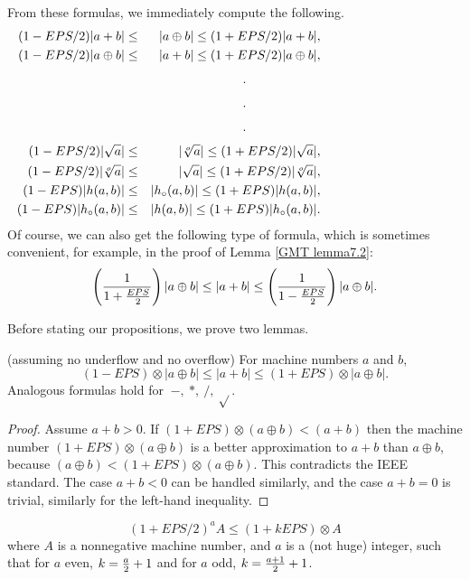  
From these formulas, we immediately compute the following.
\begin{eqnarray*}
(1 - EPS/2) |a + b| &\leq& |a \oplus b| 
\leq (1 + EPS/2) |a+b|, \\ 
  (1 - EPS/2) |a \oplus b|& \leq& |a + b| 
\leq (1 + EPS/2) |a \oplus b|,\\
\noalign{\vskip4pt}
\noalign{\hfil .\hfil }  \noalign{\vskip4pt}
\noalign{\hfil .\hfil } \noalign{\vskip4pt}
\noalign{\hfil .\hfil } \noalign{\vskip4pt}
(1 - EPS/2) |\sqrt a| &\leq&  |\root o \of a| 
\leq (1 + EPS/2) |\sqrt a|, \\ (1 - EPS/2) |\root o \of a|&\leq&  |\sqrt a| 
\leq (1 + EPS/2) |\root o \of a|, \\  (1 - EPS) |h(a,b)| &\leq&  |h_\circ (a,b)| 
\leq (1 + EPS) |h(a,b)|, \\  (1 - EPS) |h_\circ (a,b)| &\leq& |h(a,b)| 
\leq (1 + EPS) |h_\circ (a,b)|.
\end{eqnarray*}
Of course, we can also get the following type of formula, which is sometimes convenient,
 for example, in the proof of Lemma \ref{GMT lemma7.2}:
$$\left({1 \over {1 + {EPS \over 2}}}\right) |a \oplus b| \leq |a + b| 
\leq \left({1 \over {1 - {EPS \over 2}}}\right) |a \oplus b|.$$

Before stating our propositions, we prove two lemmas.

\begin{lemma}\label{GMT 7.0} {\textrm (assuming no underflow and no overflow)}
For machine numbers $a$ and $b${\textrm ,}
$$(1 - EPS) \otimes |a \oplus b| \le |a + b| \le (1 + EPS) \otimes |a \oplus b|.$$
 Analogous formulas hold for $\ -,\ *,\ /,\ \sqrt{}$.
\end{lemma}

\begin{proof}{}
Assume $a+b > 0$.  
If $(1+EPS) \otimes (a \oplus b) < (a+b)$ then the machine number 
$(1+EPS) \otimes (a \oplus b)$ is a better approximation to $a+b$ than $a \oplus b$, because $(a \oplus b) 
< (1+EPS) \otimes (a \oplus b)$.  This contradicts the IEEE standard.  The case $a+b < 0$ can be handled similarly, and the
case $a+b = 0$ is trivial, similarly for the left-hand inequality.
\end{proof}

\begin{lemma}\label{GMT lemma7.1} $$(1 + EPS/2)^a A \le (1 + k EPS) \otimes A$$ 
 where $A$ is a nonnegative machine number{\textrm ,} and $a$ is a {\textrm (}\/not huge\/{\textrm )} integer{\textrm ,} such that
for $a$ even{\textrm ,} $k = {a \over 2} + 1$ and  for $a$ odd, $k = {a+1 \over 2} + 1$. 
\end{lemma}

